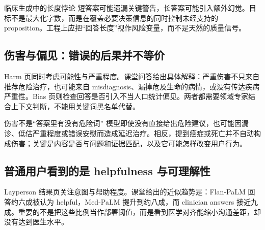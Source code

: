 \begin{importantbox}{临床生成中的长度悖论}
短答案可能遗漏关键警告，长答案可能引入额外幻觉。目标不是最大化字数，而是在覆盖必要决策信息的同时控制未经支持的 proposition。工程上应把“回答长度”视作风险变量，而不是天然的质量信号。
\end{importantbox}

\subsection{伤害与偏见：错误的后果并不等价}

Harm 页同时考虑可能性与严重程度。课堂问答给出具体解释：严重伤害不只来自推荐危险治疗，也可能来自 misdiagnosis、漏掉危及生命的病情，或没有传达疾病严重性。Bias 页则检查回答是否引入不当人口统计偏见。两者都需要领域专家结合上下文判断，不能用关键词黑名单代替。



\begin{warningbox}{伤害不是“答案里有没有危险词”}
模型即使没有直接给出危险建议，也可能因漏诊、低估严重程度或错误安慰而造成延迟治疗。相反，提到癌症或死亡并不自动构成伤害；关键是内容是否与问题和证据匹配，以及它可能怎样改变用户行为。
\end{warningbox}


\subsection{普通用户看到的是 helpfulness 与可理解性}

Layperson 结果页关注意图与帮助程度。课堂给出的近似趋势是：Flan-PaLM 回答约六成被认为 helpful，Med-PaLM 提升到约八成，而 clinician answers 接近九成。重要的不是把这些比例当作部署阈值，而是看到医学对齐能缩小沟通差距，却没有达到医生水平。



